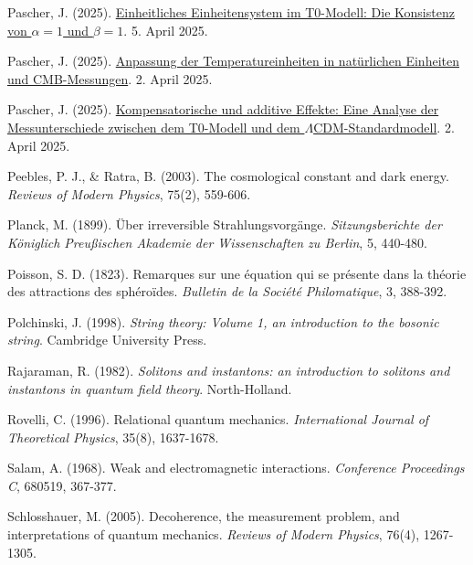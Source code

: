 \documentclass[a4paper,12pt]{article}
\begin{document}
\begin{thebibliography}{99}
		 Pascher, J. (2025). \href{https://github.com/jpascher/T0-Time-Mass-Duality/tree/main/2/pdf/Deutsch/Alpha1Beta1Konsistenz.pdf}{Einheitliches Einheitensystem im T0-Modell: Die Konsistenz von \(\alpha = 1\) und \(\beta = 1\)}. 5. April 2025.
		
		 Pascher, J. (2025). \href{https://github.com/jpascher/T0-Time-Mass-Duality/tree/main/2/pdf/Deutsch/TempEinheitenCMB.pdf}{Anpassung der Temperatureinheiten in natürlichen Einheiten und CMB-Messungen}. 2. April 2025.
		
		 Pascher, J. (2025). \href{https://github.com/jpascher/T0-Time-Mass-Duality/tree/main/2/pdf/Deutsch/MessdifferenzenT0Standard.pdf}{Kompensatorische und additive Effekte: Eine Analyse der Messunterschiede zwischen dem T0-Modell und dem \(\Lambda\)CDM-Standardmodell}. 2. April 2025.
		
		 Peebles, P. J., \& Ratra, B. (2003). The cosmological constant and dark energy. \textit{Reviews of Modern Physics}, 75(2), 559-606.
		
		 Planck, M. (1899). Über irreversible Strahlungsvorgänge. \textit{Sitzungsberichte der Königlich Preußischen Akademie der Wissenschaften zu Berlin}, 5, 440-480.
		
		 Poisson, S. D. (1823). Remarques sur une équation qui se présente dans la théorie des attractions des sphéroïdes. \textit{Bulletin de la Société Philomatique}, 3, 388-392.
		
		 Polchinski, J. (1998). \textit{String theory: Volume 1, an introduction to the bosonic string}. Cambridge University Press.
		
		 Rajaraman, R. (1982). \textit{Solitons and instantons: an introduction to solitons and instantons in quantum field theory}. North-Holland.
		
		 Rovelli, C. (1996). Relational quantum mechanics. \textit{International Journal of Theoretical Physics}, 35(8), 1637-1678.
		
		 Salam, A. (1968). Weak and electromagnetic interactions. \textit{Conference Proceedings C}, 680519, 367-377.
		
		 Schlosshauer, M. (2005). Decoherence, the measurement problem, and interpretations of quantum mechanics. \textit{Reviews of Modern Physics}, 76(4), 1267-1305.
		

\end{thebibliography}
\end{document}
